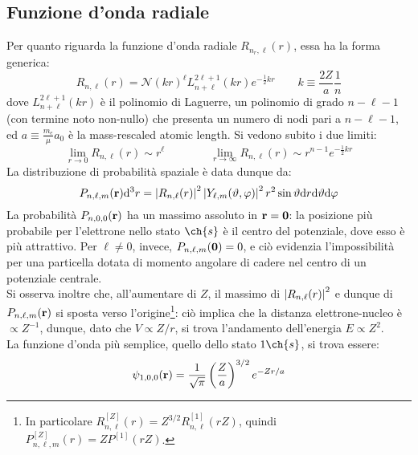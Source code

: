\subsection{Funzione d'onda radiale}

Per quanto riguarda la funzione d'onda radiale $ R_{n_r,\ell}(r) $, essa ha la forma generica:
\begin{equation}
	R_{n,\ell}(r) = \mathcal{N} (kr)^\ell L_{n+\ell}^{2\ell + 1}(kr) e^{-\frac{1}{2} kr}
	\qquad
	k \equiv \frac{2Z}{a} \frac{1}{n}
	\label{eq:1-e-radial}
\end{equation}
dove $ L_{n+\ell}^{2\ell+1}(kr) $ è il polinomio di Laguerre, un polinomio di grado $ n - \ell - 1 $ (con termine noto non-nullo) che presenta un numero di nodi pari a $ n - \ell - 1 $, ed $ a \equiv \frac{m_e}{\mu} a_0 $ è la mass-rescaled atomic length. Si vedono subito i due limiti:
\begin{equation*}
	\lim_{r \rightarrow 0} R_{n,\ell}(r) \sim r^\ell
	\qquad \qquad
	\lim_{r \rightarrow \infty} R_{n,\ell}(r) \sim r^{n-1} e^{-\frac{1}{2} kr}
\end{equation*}
La distribuzione di probabilità spaziale è data dunque da:
\begin{equation}
	P_{n,\ell,m}(\mathbf{r}) \mathrm{d}^3r = \left\lvert R_{n,\ell}(r)\right\rvert^2 \left\lvert Y_{\ell,m}(\vartheta,\varphi)\right\rvert^2 r^2 \sin{\vartheta} \mathrm{d} r \mathrm{d} \vartheta \mathrm{d} \varphi
\end{equation}
La probabilità $ P_{n,0,0}(\mathbf{r}) $ ha un massimo assoluto in $ \mathbf{r} = \mathbf{0} $: la posizione più probabile per l'elettrone nello stato $ \ch{s} $ è il centro del potenziale, dove esso è più attrattivo. Per $ \ell \neq 0 $, invece, $ P_{n,\ell,m}(\mathbf{0}) = 0 $, e ciò evidenzia l'impossibilità per una particella dotata di momento angolare di cadere nel centro di un potenziale centrale.\\
Si osserva inoltre che, all'aumentare di $ Z $, il massimo di $ \left\lvert R_{n,\ell}(r)\right\rvert^2 $ e dunque di $ P_{n,\ell,m}(\mathbf{r}) $ si sposta verso l'origine\footnote{In particolare $ R_{n,\ell}^{[Z]}(r) = Z^{3/2} R_{n,\ell}^{[1]}(rZ) $, quindi $ P_{n,\ell,m}^{[Z]}(r) = Z P^{[1]}(rZ) $.}: ciò implica che la distanza elettrone-nucleo è $ \propto Z^{-1} $, dunque, dato che $ V \propto Z/r $, si trova l'andamento dell'energia $ E \propto Z^2 $.\\
La funzione d'onda più semplice, quello dello stato $ 1\ch{s} $, si trova essere:
\begin{equation}
	\psi_{1,0,0}(\mathbf{r}) = \frac{1}{\sqrt{\pi}} \left( \frac{Z}{a} \right)^{3/2} e^{- Z r / a}
\end{equation}

